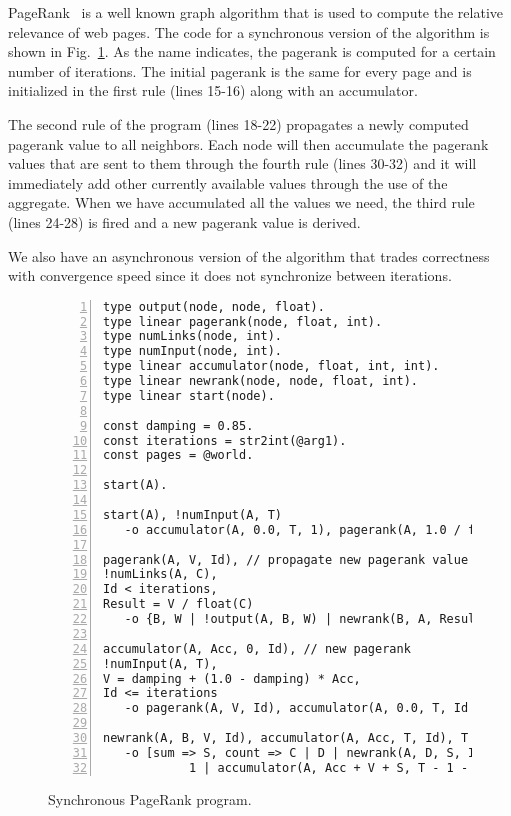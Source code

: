 PageRank~\cite{Page:2001:MNR} is a well known graph algorithm that is used to compute the relative relevance of web pages.
The code for a synchronous version of the algorithm is shown in Fig.~\ref{code:pagerank}.
As the name indicates, the pagerank is computed for a certain number of iterations. The initial pagerank is the same for every page and is
initialized in the first rule (lines 15-16) along with an accumulator.

The second rule of the program (lines 18-22) propagates a newly computed pagerank value to all neighbors. Each node will then accumulate
the pagerank values that are sent to them through the fourth rule (lines 30-32) and it will immediately add other currently available values
through the use of the aggregate. When we have accumulated all the values we need, the third rule (lines 24-28) is fired and a new pagerank value is derived.

We also have an asynchronous version of the algorithm that trades correctness with convergence speed since it does not synchronize between iterations.

\begin{figure}[h!]
   \footnotesize\begin{Verbatim}[numbers=left]
type output(node, node, float).
type linear pagerank(node, float, int).
type numLinks(node, int).
type numInput(node, int).
type linear accumulator(node, float, int, int).
type linear newrank(node, node, float, int).
type linear start(node).

const damping = 0.85.
const iterations = str2int(@arg1).
const pages = @world.

start(A).

start(A), !numInput(A, T)
   -o accumulator(A, 0.0, T, 1), pagerank(A, 1.0 / float(pages), 0).

pagerank(A, V, Id), // propagate new pagerank value
!numLinks(A, C),
Id < iterations,
Result = V / float(C)
   -o {B, W | !output(A, B, W) | newrank(B, A, Result, Id + 1)}.

accumulator(A, Acc, 0, Id), // new pagerank
!numInput(A, T),
V = damping + (1.0 - damping) * Acc,
Id <= iterations
   -o pagerank(A, V, Id), accumulator(A, 0.0, T, Id + 1).
	
newrank(A, B, V, Id), accumulator(A, Acc, T, Id), T > 0
   -o [sum => S, count => C | D | newrank(A, D, S, Id) |
            1 | accumulator(A, Acc + V + S, T - 1 - C, Id)].
\end{Verbatim}
\caption{Synchronous PageRank program.}
\label{code:pagerank}
\normalsize
\end{figure}

